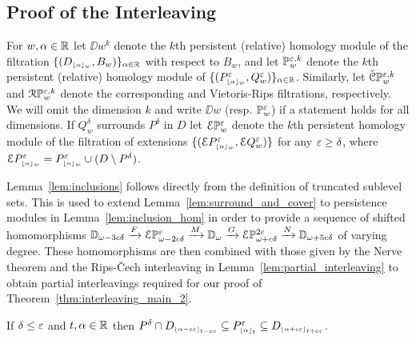 


\subsection{Proof of the Interleaving}

For $w,\alpha\in\R$ let $\DD{w}^k$ denote the $k$th persistent (relative) homology module of the filtration $\{(D\subi{w}{\alpha},B_w)\}_{\alpha\in\R}$ with respect to $B_w$, and let $\PP{w}{\e,k}$ denote the $k$th persistent (relative) homology module of $\{(P\subi{w}{\alpha}^\e,Q_w^\e)\}_{\alpha\in\R}$.
Similarly, let $\CPP{w}{\e,k}$ and $\RPP{w}{\e,k}$ denote the corresponding \Cech and Vietoris-Rips filtrations, respectively.
We will omit the dimension $k$ and write $\DD{w}$ (resp. $\PP{w}{\e}$) if a statement holds for all dimensions.
If $Q_w^\delta$ surrounds $P^\delta$ in $D$ let $\ext{\PP{w}{\e}}$ denote the $k$th persistent homology module of the filtration of extensions $\{(\ext{P\subi{w}{\alpha}^\e},\ext{Q_w^\e})\}$ for any $\e\geq\delta$, where $\ext{P\subi{w}{\alpha}^\e} = P\subi{w}{\alpha}^\e \cup (D\setminus P^\delta)$.



Lemma~\ref{lem:inclusions} follows directly from the definition of truncated sublevel sets.
This is used to extend Lemma~\ref{lem:surround_and_cover} to persistence modules in Lemma~\ref{lem:inclusion_hom} in order to provide a sequence of shifted homomorphisms $\DD{\omega-3c\delta}\xrightarrow{F}\E\PP{\omega-2c\delta}{\e}\xrightarrow{M}\DD{\omega}\xrightarrow{G}\E\PP{\omega+c\delta}{2\e}\xrightarrow{N}\DD{\omega+5c\delta}$ of varying degree.
These homomorphisms are then combined with those given by the Nerve theorem and the Rips-\v Cech interleaving in Lemma~\ref{lem:partial_interleaving} to obtain partial interleavings required for our proof of Theorem~\ref{thm:interleaving_main_2}.

\begin{lemma}\label{lem:inclusions}
  If $\delta\leq\e$ and $t,\alpha\in\R$ then $P^\delta\cap D\subi{t-c\e}{\alpha-c\e}\subseteq P\subi{t}{\alpha}^\e\subseteq D\subi{t+c\e}{\alpha+c\e}$.
\end{lemma}


